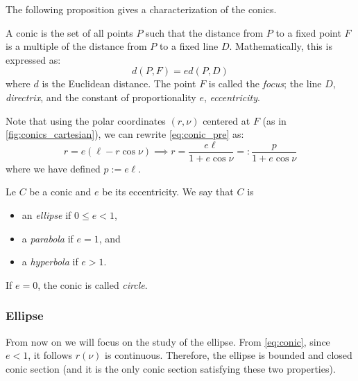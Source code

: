 \documentclass[../main.tex]{subfiles}
\begin{document}
The following proposition gives a characterization of the conics.
\begin{proposition}
  A conic is the set of all points $P$ such that the distance from $P$ to a fixed point $F$ is a multiple of the distance from $P$ to a fixed line $D$. Mathematically, this is expressed as:
  \begin{equation}\label{eq:conic_pre}
    d(P,F)=e d(P,D)
  \end{equation}
  where $d$ is the Euclidean distance. The point $F$ is called the \emph{focus}; the line $D$, \emph{directrix}, and the constant of proportionality $e$, \emph{eccentricity}.
\end{proposition}
Note that using the polar coordinates $(r,\nu)$ centered at $F$ (as in \cref{fig:conics_cartesian}), we can rewrite \cref{eq:conic_pre} as:
\begin{equation}\label{eq:conic}
  r=e(\ell - r\cos\nu)\implies r= \frac{e\ell}{1+e\cos\nu}=:\frac{p}{1+e\cos\nu}
\end{equation}
where we have defined $p:=e\ell$.
\begin{definition}
  Le $C$ be a conic and $e$ be its eccentricity. We say that $C$ is
  \begin{itemize}
    \item an \emph{ellipse} if $0\leq e<1$,
    \item a \emph{parabola} if $e=1$, and
    \item a \emph{hyperbola} if $e>1$.
  \end{itemize}
  If $e=0$, the conic is called \emph{circle}.
\end{definition}
\subsubsection{Ellipse}\label{sec:ellipse}
From now on we will focus on the study of the ellipse. From \cref{eq:conic}, since $e<1$, it follows $r(\nu)$ is continuous. Therefore, the ellipse is bounded and closed conic section (and it is the only conic section satisfying these two properties).
\end{document}
